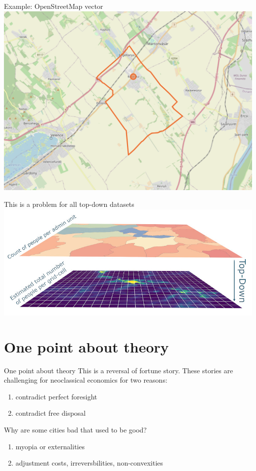 \documentclass[
  ignorenonframetext,
  aspectratio=16,
]{beamer}
\providecommand{\tightlist}{%
  \setlength{\itemsep}{0pt}\setlength{\parskip}{0pt}}
\begin{document}
\begin{frame}{Example: OpenStreetMap vector}
\protect\hypertarget{example-openstreetmap-vector}{}
\includegraphics{vector.png}
\end{frame}

\begin{frame}{This is a problem for all top-down datasets}
\protect\hypertarget{this-is-a-problem-for-all-top-down-datasets}{}
\includegraphics{topdown.jpg}
\end{frame}

\hypertarget{one-point-about-theory}{%
\section{One point about theory}\label{one-point-about-theory}}

\begin{frame}{One point about theory}
\protect\hypertarget{one-point-about-theory-1}{}
This is a reversal of fortune story. These stories are challenging for
neoclassical economics for two reasons:

\begin{enumerate}
\tightlist
\item
  contradict perfect foresight
\item
  contradict free disposal
\end{enumerate}
\end{frame}

\begin{frame}{Why are some cities bad that used to be good?}
\protect\hypertarget{why-are-some-cities-bad-that-used-to-be-good}{}
\begin{enumerate}
\tightlist
\item
  myopia or externalities
\item
  adjustment costs, irreversbilities, non-convexities
\end{enumerate}
\end{frame}
\end{document}
